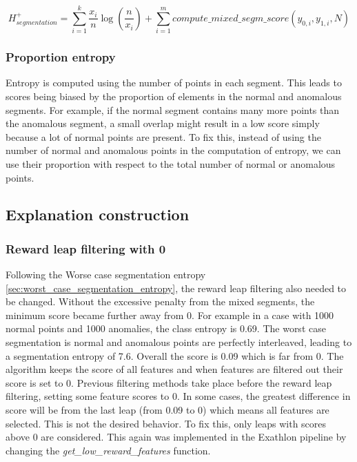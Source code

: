 \documentclass[11pt]{article}
\begin{document}
\begin{equation}
    H_{segmentation}^{+} = \sum_{i=1}^{k} \frac{x_i}{n} \log(\frac{n}{x_i}) + \sum_{i=1}^{m} compute\_mixed\_segm\_score(y_{0, i}, y_{1, i}, N)
\end{equation}




\subsubsection{Proportion entropy}
Entropy is computed using the number of points in each segment. This leads to scores being biased by the proportion of elements in the normal and anomalous segments. For example, if the normal segment contains many more points than the anomalous segment, a small overlap might result in a low score simply because a lot of normal points are present.
To fix this, instead of using the number of normal and anomalous points in the computation of entropy, we can use their proportion with respect to the total number of normal or anomalous points.



\subsection{Explanation construction}


\subsubsection{Reward leap filtering with 0}
Following the Worse case segmentation entropy \ref{sec:worst_case_segmentation_entropy}, the reward leap filtering also needed to be changed. Without the excessive penalty from the mixed segments, the minimum score became further away from 0. For example in a case with 1000 normal points and 1000 anomalies, the class entropy is 0.69. The worst case segmentation is normal and anomalous points are perfectly interleaved, leading to a segmentation entropy of 7.6. Overall the score is 0.09 which is far from 0. The algorithm keeps the score of all features and when features are filtered out their score is set to 0. Previous filtering methods take place before the reward leap filtering, setting some feature scores to 0. In some cases, the greatest difference in score will be from the last leap (from 0.09 to 0) which means all features are selected. This is not the desired behavior. To fix this, only leaps with scores above 0 are considered. This again was implemented in the Exathlon pipeline \cite{exathlon-private} by changing the \textit{get\_low\_reward\_features} function.
\end{document}

